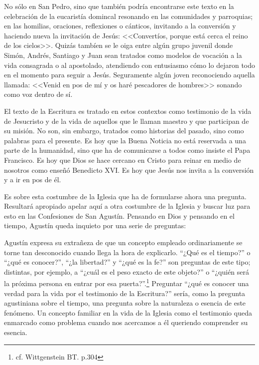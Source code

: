   No sólo en San Pedro, sino que también podría encontrarse este texto en la
  celebración de la eucaristía domincal resonando en las comunidades y parroquias;
  en las homilias, oraciones, reflexiones o cánticos, invitando a la conversión y
  haciendo nueva la invitación de Jesús: <<Convertíos, porque está cerca el reino
  de los cielos>>. Quizás tambíen se le oiga entre algún grupo juvenil donde
  Simón, Andrés, Santiago y Juan sean tratados como modelos de vocación a la vida
  consagrada o al apostolado, atendiendo con entusiasmo cómo lo dejaron todo en el
  momento para seguir a Jesús. Seguramente algún joven reconociendo aquella
  llamada: <<Venid en pos de mí y os haré pescadores de hombres>> sonando como voz
  dentro de sí.

  El texto de la Escritura es tratado en estos contextos como testimonio de la
  vida de Jesucristo y de la vida de aquellos que le llaman maestro y que
  participan de su misión. No son, sin embargo, tratados como historias del
  pasado, sino como palabras para el presente. Es hoy que la Buena Noticia no está
  reservada a una parte de la humanidad, sino que ha de comunicarse a todos como
  insiste el Papa Francisco. Es hoy que Dios se hace cercano en Cristo para reinar
  en medio de nosotros como enseñó Benedicto XVI. Es hoy que Jesús nos invita a la
  conversión y a ir en pos de él.

  Es sobre esta costumbre de la Iglesia que ha de formularse ahora una pregunta.
  Resultará apropiado apelar aquí a otra costumbre de la Iglesia y buscar luz para
  esto en las Confesiones de San Agustín. Pensando en Dios y pensando en el
  tiempo, Agustín queda inquieto por una serie de preguntas: 

  Agustín expresa su extrañeza de que un concepto empleado ordinariamente se
  torne tan desconocido cuando llega la hora de explicarlo. ``¿Qué es el
  tiempo?'' o ``¿qué es conocer?'', ``¿la libertad?'' y ``¿qué es la fe?'' son
  preguntas de este tipo; distintas, por ejemplo, a ``¿cuál es el peso exacto de
  este objeto?'' o ``¿quién será la próxima persona en entrar por esa
  puerta?''.\footnote{cf. Wittgenstein BT. p.304} Preguntar ``¿qué es conocer una
  verdad para la vida por el testimonio de la Escritura?'' sería, como la pregunta
  agustiniana sobre el tiempo, una pregunta sobre la naturaleza o esencia de
  este fenómeno. Un concepto familiar en la vida de la Iglesia como el
  testimonio queda enmarcado como problema cuando nos acercamos a él queriendo
  comprender su esencia.

